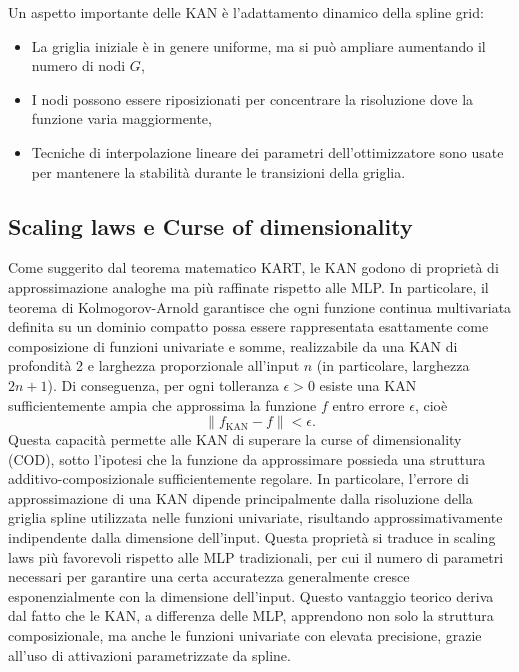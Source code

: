 \documentclass[a4paper,12pt]{report}
\begin{document}
	Un aspetto importante delle KAN è l’adattamento dinamico della spline grid:
	\begin{itemize}
		\item La griglia iniziale è in genere uniforme, ma si può ampliare aumentando il numero di nodi \(G\),
		\item I nodi possono essere riposizionati per concentrare la risoluzione dove la funzione varia maggiormente,
		\item Tecniche di interpolazione lineare dei parametri dell’ottimizzatore sono usate per mantenere la stabilità durante le transizioni della griglia.
	\end{itemize}
	
	\subsection{Scaling laws e Curse of dimensionality}
	Come suggerito dal teorema matematico KART, le KAN godono di proprietà di approssimazione analoghe ma più raffinate rispetto alle MLP. In particolare, il teorema di Kolmogorov-Arnold garantisce che ogni funzione continua multivariata definita su un dominio compatto possa essere rappresentata esattamente come composizione di funzioni univariate e somme, realizzabile da una KAN di profondità 2 e larghezza proporzionale all'input $n$ (in particolare, larghezza $2n + 1$).
	Di conseguenza, per ogni tolleranza $\epsilon > 0$ esiste una KAN sufficientemente ampia che approssima la funzione $f$ entro errore $\epsilon$, cioè
	\begin{equation*}
		\| f_{\mathrm{KAN}} - f \| < \epsilon.
	\end{equation*}
	Questa capacità permette alle KAN di superare la curse of dimensionality (COD), sotto l'ipotesi che la funzione da approssimare possieda una struttura additivo-composizionale sufficientemente regolare.
	In particolare, l'errore di approssimazione di una KAN dipende principalmente dalla risoluzione della griglia spline utilizzata nelle funzioni univariate, risultando approssimativamente indipendente dalla dimensione dell'input. Questa proprietà si traduce in scaling laws più favorevoli rispetto alle MLP tradizionali, per cui il numero di parametri necessari per garantire una certa accuratezza generalmente cresce esponenzialmente con la dimensione dell'input. Questo vantaggio teorico deriva dal fatto che le KAN, a differenza delle MLP, apprendono non solo la struttura composizionale, ma anche le funzioni univariate con elevata precisione, grazie all'uso di attivazioni parametrizzate da spline.
	
\end{document}

